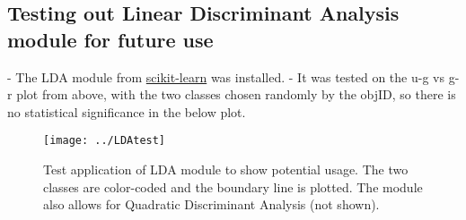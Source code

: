 \documentclass[12pt]{article}
\begin{document}
\subsection{Testing out Linear Discriminant Analysis module for future use}
- The LDA module from \href{http://scikit-learn.org/stable/install.html}{scikit-learn} was installed.
- It was tested on the u-g vs g-r plot from above, with the two classes chosen randomly by the objID, so there is no statistical significance in the below plot.\\
\begin{figure}
\texttt{[image: ../LDAtest]}\\
\caption{Test application of LDA module to show potential usage. The two classes are color-coded and the boundary line is plotted. The module also allows for Quadratic Discriminant Analysis (not shown).}
\end{figure}
\end{document}
